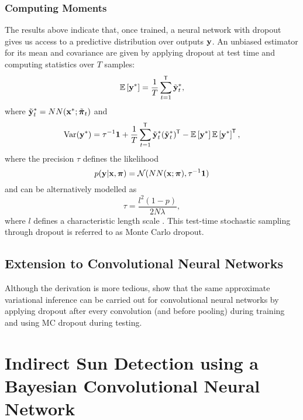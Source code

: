 \subsubsection{Computing Moments}
The results above indicate that, once trained, a neural network with dropout gives us access to a predictive distribution over outputs $\boldsymbol{\mathbf{y}}$. An unbiased estimator for its mean and covariance are given by applying dropout at test time and computing statistics over $T$ samples:
\begin{equation}
\label{eq:sun_bcnn_mc_dropout_mean}
	\mathbb{E}\left[\boldsymbol{\mathbf{y}}^*\right] = \frac{1}{T} \sum_{t=1}^{\mkern-1.0mu\mathsf{T}} \tilde{\boldsymbol{\mathbf{y}}}^*_t,
\end{equation}
where $\tilde{\boldsymbol{\mathbf{y}}}^*_t = NN(\boldsymbol{\mathbf{x}}^*; \tilde{\boldsymbol{\mathbf{\pi}}}_t)$ and
\begin{equation}
\label{eq:sun_bcnn_mc_dropout_variance}
	\text{Var}(\boldsymbol{\mathbf{y}}^*) = \tau^{-1} \boldsymbol{\mathbf{1}} +  \frac{1}{T} \sum_{t=1}^{\mkern-1.0mu\mathsf{T}} \tilde{\boldsymbol{\mathbf{y}}}^*_t (\tilde{\boldsymbol{\mathbf{y}}}^*_t)^{\mkern-1.0mu\mathsf{T}} - \mathbb{E}\left[\boldsymbol{\mathbf{y}}^*\right] \mathbb{E}\left[\boldsymbol{\mathbf{y}}^*\right]^{\mkern-1.0mu\mathsf{T}},
\end{equation}
where the precision $\tau$ defines the likelihood 
\begin{equation}
	p(\boldsymbol{\mathbf{y}} | \boldsymbol{\mathbf{x}}, \boldsymbol{\mathbf{\pi}}) = \mathcal{N}(NN(\boldsymbol{\mathbf{x}}; \boldsymbol{\mathbf{\pi}}),\tau^{-1}\boldsymbol{\mathbf{1}})	
\end{equation}
and can be alternatively modelled as
\begin{equation}
	\tau = \frac{l^2 (1 - p)}{2N\lambda},
\end{equation} 
where $l$ defines a characteristic length scale \citep{Gal2016UncertaintyThesis}. This test-time stochastic sampling through dropout is referred to as Monte Carlo dropout.

\subsection{Extension to Convolutional Neural Networks}
Although the derivation is more tedious, \cite{Gal2016UncertaintyThesis,Gal2016CNN} show that the same approximate variational inference can be carried out for convolutional neural networks by applying dropout after every convolution (and before pooling) during training and using MC dropout during testing.



\section{Indirect Sun Detection using a Bayesian Convolutional Neural Network} \label{sec:sun-bcnn}

